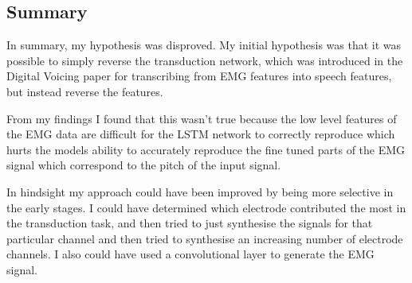 \subsection{Summary}

In summary, my hypothesis was disproved.
My initial hypothesis was that it was possible to simply reverse the
transduction network, which was introduced in the Digital Voicing paper
for transcribing from EMG features into speech features, but instead
reverse the features.

From my findings I found that this wasn't true because the low level 
features of the EMG data are difficult for the LSTM network to correctly
reproduce which hurts the models ability to accurately reproduce the
fine tuned parts of the EMG signal which correspond to the pitch of the
input signal.

In hindsight my approach could have been improved by being more selective in
the early stages. I could have determined which electrode contributed the most
in the transduction task, and then tried to just synthesise the signals for that 
particular channel and then tried to synthesise an increasing number of
electrode channels. I also could have used a convolutional layer
to generate the EMG signal.